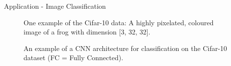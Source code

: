 \begin{vbframe}{Application - Image Classification}
\begin{figure}
        \caption{One example of the Cifar-10 data: A highly pixelated, coloured image of a frog with dimension [3, 32, 32]. }
    \end{figure}
\framebreak
    \begin{figure}
        \centering
        \caption{An example of a CNN architecture for classification on the Cifar-10 dataset (FC = Fully Connected). }
    \end{figure}  
\end{vbframe}

